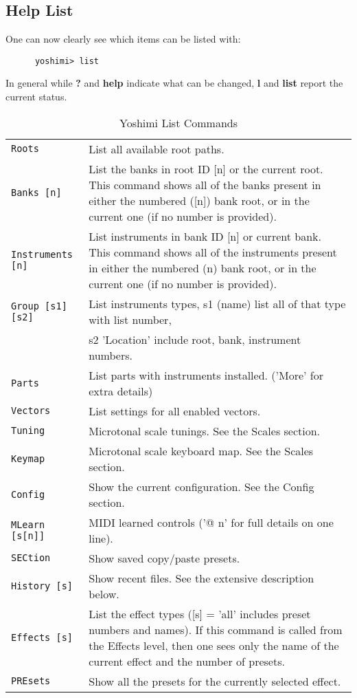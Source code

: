 \subsection{Help List}
\label{subsec:command_line_help_list}

   One can now clearly see which items can be listed with:

   \begin{verbatim}
      yoshimi> list
   \end{verbatim}

   In general while \textbf{?} and \textbf{help} indicate what can be
   changed, \textbf{l} and \textbf{list} report the current status.

\begin{center}
\begin{longtable}{p{4cm} p{10cm}}
\caption[Yoshimi List Commands]{Yoshimi List Commands} \\

\texttt{Roots} &
   List all available root paths. \\
\texttt{Banks [n]} &
   List the banks in root ID [n] or the current root.
   This command shows all of the banks present in either the numbered ([n])
   bank root, or in the current one (if no number is provided).  \\
\texttt{Instruments [n]} &
   List instruments in bank ID [n] or current bank.
   This command shows all of the instruments present in either the numbered
   (n) bank root, or in the current one (if no number is provided).  \\
\texttt{Group [s1] [s2]} &
   List instruments types, s1 (name) list all of that type with list number,
   \\
\texttt{ } &
   s2 'Location' include root, bank, instrument numbers. \\
\texttt{Parts} &
   List parts with instruments installed. ('More' for extra details)\\
\texttt{Vectors} &
   List settings for all enabled vectors. \\
\texttt{Tuning} &
   Microtonal scale tunings. See the Scales section. \\
\texttt{Keymap} &
   Microtonal scale keyboard map.  See the Scales section. \\
\texttt{Config} &
   Show the current configuration. See the Config section. \\
\texttt{MLearn [s[n]]} &
   MIDI learned controls ('@ n' for full details on one line). \\
\texttt{SECtion} &
   Show saved copy/paste presets. \\
\texttt{History [s]} &
   Show recent files. See the extensive description below. \\
\texttt{Effects [s]} &
   List the effect types ([s] = 'all' includes preset numbers and names).
   If this command is called from the Effects level, then one sees only the
   name of the current effect and the number of presets. \\
\texttt{PREsets} &
   Show all the presets for the currently selected effect. \\

\end{longtable}
\end{center}

